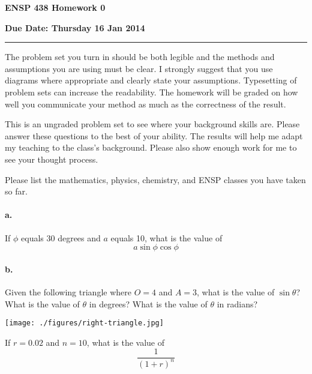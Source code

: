\documentclass{article}
\newcommand{\chead}[1]
{\begin{center}\large\textbf{#1}\end{center}}
\begin{document}
\chead{ENSP 438 Homework 0}
\chead{Due Date:  Thursday 16 Jan 2014}
\hrule
\vspace{10pt}

The problem set you turn in should be both legible and the methods and
assumptions you are using must be clear.  I strongly suggest that you
use diagrams where appropriate and clearly state your assumptions.
Typesetting of problem sets can increase the readability.  The homework
will be graded on how well you communicate your method as much as the
correctness of the result.

This is an ungraded problem set to see where your background skills are.
Please answer these questions to the best of your ability.  The results
will help me adapt my teaching to the class's background.  Please also
show enough work for me to see your thought process.


Please list the mathematics, physics, chemistry, and ENSP classes you
have taken so far.


\paragraph{a.} If $\phi$ equals 30 degrees and $a$ equals 10, what is the value of
$$ a\sin\phi\cos\phi $$


\paragraph{b.} Given the following triangle where $O=4$ and $A=3$, what is the value of
$\sin\theta$?  What is the value of $\theta$ in degrees?  What is the
value of $\theta$ in radians?

\texttt{[image: ./figures/right-triangle.jpg]}




If $r = 0.02$ and $n = 10$, what is the value of
$$ \frac{1}{(1 + r)^n} $$

\end{document}
